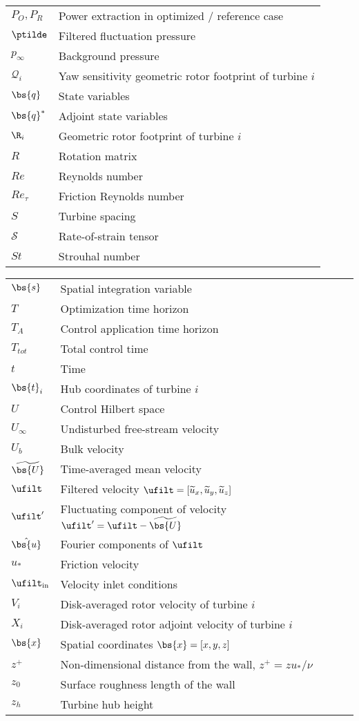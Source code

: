\begin{tabular}{ p{2cm}  l }
	$P_O, P_R$  & Power extraction in optimized / reference case\\
	$\ptilde$    & Filtered fluctuation pressure\\
	$p_\infty$  & Background pressure\\
	$\mathscr{Q}_i$ & Yaw sensitivity geometric rotor footprint of turbine $i$\\
	$\bs{q}$    & State variables \\
	$\bs{q}^*$  & Adjoint state variables\\
	$\R_i$      & Geometric rotor footprint of turbine $i$\\
	$R$ 		& Rotation matrix\\
	$Re$ 		& Reynolds number\\
	$Re_\tau$   & Friction Reynolds number\\
	$S$ 		& Turbine spacing\\
	$\mathcal{S}$ & Rate-of-strain tensor\\
	$St$    	& Strouhal number\\
\end{tabular}

\begin{tabular}{ p{2cm}  l }
	$\bs{s}$    & Spatial integration variable\\
	$T$     	& Optimization time horizon\\
	$T_A$   	& Control application time horizon\\
	$T_{tot}$ 	& Total control time\\
	$t$   		& Time\\
	$\bs{t}_i$ 	& Hub coordinates of turbine $i$\\
	$U$      	& Control Hilbert space\\
	$U_\infty$ 	& Undisturbed free-stream velocity\\
	$U_b$ 	 	& Bulk velocity\\
	$\widetilde{\bs{U}}$  	& Time-averaged mean velocity\\ 
	$\ufilt$ 	& Filtered velocity $\ufilt = [\widetilde{u}_x, \widetilde{u}_y, \widetilde{u}_z]$\\
	$\ufilt'$   & Fluctuating component of velocity $\ufilt' = \ufilt - \widetilde{\bs{U}}$\\
	$\hat{\bs{u}}$ &  Fourier components of $\ufilt$\\
	$u_*$    	& Friction velocity\\
	$\ufilt_{\rm in}$ & Velocity inlet conditions\\
	$V_i$    	& Disk-averaged rotor velocity of turbine $i$\\
	$X_i$    	& Disk-averaged rotor adjoint velocity of turbine $i$\\
	$\bs{x}$  	& Spatial coordinates $\bs{x} = [x,y,z]$\\
	$z^+$    	& Non-dimensional distance from the wall, $z^+ = z u_* / \nu$\\
	$z_0$    	& Surface roughness length of the wall\\
	$z_h$ 	 	& Turbine hub height\\
\end{tabular}

